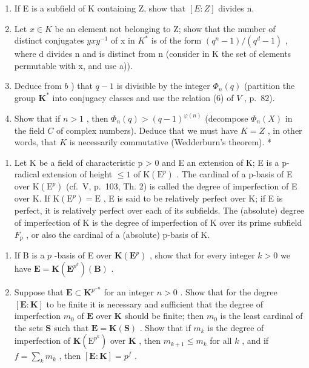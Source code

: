 \begin{enumerate}
\def\labelenumi{\alph{enumi})}
\item
  If E is a subfield of K containing Z, show that \([E:Z]\) divides n.
\item
  Let \(x \in K\) be an element not belonging to Z; show that the number of distinct conjugates \(yxy^{-1}\) of x in \(K^{*}\) is of the form \((q^{n}-1)/(q^{d}-1)\) , where d divides n and is distinct from n (consider in K the set of elements permutable with x, and use a)).
\item
  Deduce from \(b\) ) that \(q - 1\) is divisible by the integer \(\Phi_n(q)\) (partition the group \(\mathbf{K}^*\) into conjugacy classes and use the relation (6) of \(V\) , p.~82).
\item
  Show that if \(n > 1\) , then \(\Phi_n(q) > (q - 1)^{\varphi(n)}\) (decompose \(\Phi_n(X)\) in the field \(C\) of complex numbers). Deduce that we must have \(K = Z\) , in other words, that \(K\) is necessarily commutative (Wedderburn's theorem). *
\end{enumerate}

\BourbakiExerciseGroup

\begin{enumerate}
\def\labelenumi{\arabic{enumi})}
\tightlist
\item
  Let K be a field of characteristic p \textgreater{} 0 and E an extension of K; E is a p-radical extension of height \(\leqslant 1\) of \(\mathrm{K}(\mathrm{E}^{p})\) . The cardinal of a p-basis of E over \(\mathrm{K}(\mathrm{E}^{p})\) (cf.~V, p.~103, Th. 2) is called the degree of imperfection of E over K. If \(\mathrm{K}(\mathrm{E}^{p}) = \mathrm{E}\) , E is said to be relatively perfect over K; if E is perfect, it is relatively perfect over each of its subfields. The (absolute) degree of imperfection of K is the degree of imperfection of K over its prime subfield \(F_{p}\) , or also the cardinal of a (absolute) p-basis of K.
\end{enumerate}

\begin{enumerate}
\def\labelenumi{\alph{enumi})}
\item
  If B is a \(p\) -basis of E over \(\mathbf{K}(\mathbf{E}^p)\) , show that for every integer \(k > 0\) we have \(\mathbf{E} = \mathbf{K}(\mathbf{E}^{p^k})(\mathbf{B})\) .
\item
  Suppose that \(\mathbf{E} \subset \mathbf{K}^{p^{-n}}\) for an integer \(n > 0\) . Show that for the degree \([\mathbf{E}:\mathbf{K}]\) to be finite it is necessary and sufficient that the degree of imperfection \(m_0\) of \(\mathbf{E}\) over \(\mathbf{K}\) should be finite; then \(m_0\) is the least cardinal of the sets \(\mathbf{S}\) such that \(\mathbf{E} = \mathbf{K}(\mathbf{S})\) . Show that if \(m_k\) is the degree of imperfection of \(\mathbf{K}(\mathrm{E}^{p^k})\) over \(\mathbf{K}\) , then \(m_{k + 1} \leqslant m_k\) for all \(k\) , and if \(f = \sum_{k} m_k\) , then \([\mathbf{E}:\mathbf{K}] = p^f\) .
\end{enumerate}

